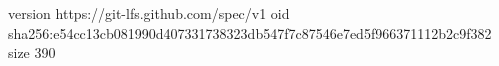 version https://git-lfs.github.com/spec/v1
oid sha256:e54cc13cb081990d407331738323db547f7c87546e7ed5f966371112b2c9f382
size 390
